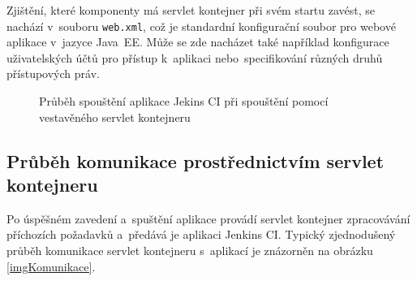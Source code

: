             Zjištění, které komponenty má servlet kontejner při svém startu zavést,
            se nachází v~souboru \texttt{web.xml}, což je standardní konfigurační soubor
            pro webové aplikace v~jazyce Java~EE. Může se zde nacházet také například
            konfigurace uživatelských účtů pro přístup k~aplikaci nebo~specifikování
            různých druhů přístupových práv.


            \begin{figure}[h!t]
                \begin{center}
                    \caption{Průběh spouštění aplikace Jekins CI při spouštění pomocí vestavěného servlet kontejneru}
                    \label{imgArchitekturaSpusteni}
                \end{center}
            \end{figure}


        \subsection{Průběh komunikace prostřednictvím servlet kontejneru}
            Po úspěšném zavedení a~spuštění aplikace provádí servlet kontejner
            zpracovávání příchozích požadavků a~předává je aplikaci Jenkins CI. 
            Typický zjednodušený průběh komunikace servlet kontejneru s~aplikací je znázorněn
            na obrázku \ref{imgKomunikace}. 

